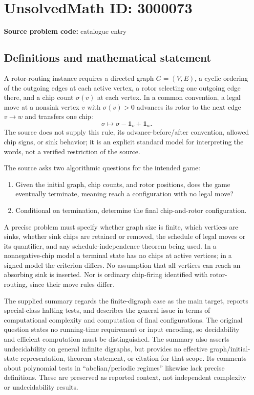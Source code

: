 \documentclass[11pt]{article}
\begin{document}
\section*{UnsolvedMath ID: 3000073}
\textbf{Source problem code:} catalogue entry
\subsection{Definitions and mathematical statement}
A rotor-routing instance requires a directed graph $G=(V,E)$, a cyclic ordering of the outgoing edges at each active vertex, a rotor selecting one outgoing edge there, and a chip count $\sigma(v)$ at each vertex. In a common convention, a legal move at a nonsink vertex $v$ with $\sigma(v)>0$ advances its rotor to the next edge $v\to w$ and transfers one chip:
\[
\sigma\longmapsto\sigma-\mathbf1_v+\mathbf1_w.
\]
The source does not supply this rule, its advance-before/after convention, allowed chip signs, or sink behavior; it is an explicit standard model for interpreting the words, not a verified restriction of the source.

The source asks two algorithmic questions for the intended game:
\begin{enumerate}
\item Given the initial graph, chip counts, and rotor positions, does the game eventually terminate, meaning reach a configuration with no legal move?
\item Conditional on termination, determine the final chip-and-rotor configuration.
\end{enumerate}
A precise problem must specify whether graph size is finite, which vertices are sinks, whether sink chips are retained or removed, the schedule of legal moves or its quantifier, and any schedule-independence theorem being used. In a nonnegative-chip model a terminal state has no chips at active vertices; in a signed model the criterion differs. No assumption that all vertices can reach an absorbing sink is inserted. Nor is ordinary chip-firing identified with rotor-routing, since their move rules differ.

The supplied summary regards the finite-digraph case as the main target, reports special-class halting tests, and describes the general issue in terms of computational complexity and computation of final configurations. The original question states no running-time requirement or input encoding, so decidability and efficient computation must be distinguished. The summary also asserts undecidability on general infinite digraphs, but provides no effective graph/initial-state representation, theorem statement, or citation for that scope. Its comments about polynomial tests in ``abelian/periodic regimes'' likewise lack precise definitions. These are preserved as reported context, not independent complexity or undecidability results.
\end{document}
